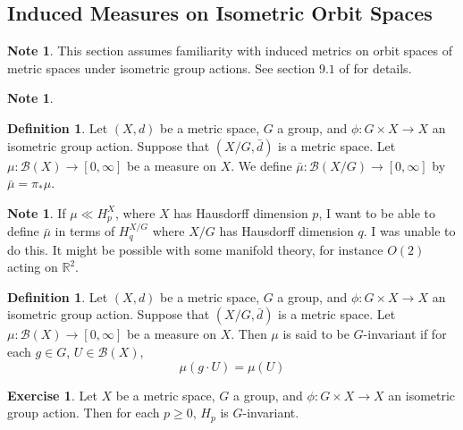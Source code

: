 \documentclass[12pt]{amsart}
\theoremstyle{definition}
\newtheorem{defn}[definition]{Definition}
\newtheorem{note}[definition]{Note}
\newtheorem{ex}[definition]{Exercise}
\newcommand{\R}{\mathbb{R}}
\newcommand{\MB}{\mathcal{B}}
\begin{document}
	
	
	
	
	
	
	
	
	
	
	
	
	
		
	\newpage
	\subsection{Induced Measures on Isometric Orbit Spaces}
	
	\begin{note}
	This section assumes familiarity with induced metrics on orbit spaces of metric spaces under isometric group actions. See section $9.1$ of \cite{analysis} for details. 
	\end{note}
	
	\begin{note}
	
	\end{note}
	
	\begin{defn}
	Let $(X, d)$ be a metric space, $G$ a group, and $\phi: G \times X \rightarrow X$ an isometric group action. Suppose that $(X/G, \bar{d})$ is a metric space. Let $\mu: \MB(X) \rightarrow [0, \infty]$ be a measure on $X$. We define $\bar{\mu}: \MB(X/G) \rightarrow [0, \infty]$ by $\bar{\mu} = \pi_* \mu$. 
	\end{defn}
	
	\begin{note}
	If $\mu \ll H_p^X$, where $X$ has Hausdorff dimension $p$, I want to be able to define $\bar{\mu}$ in terms of $H_q^{X/G}$ where $X/G$ has Hausdorff dimension $q$. I was unable to do this. It might be possible with some manifold theory, for instance $O(2)$ acting on $\R^2$.
	\end{note}
	
	\begin{defn}
	Let $(X, d)$ be a metric space, $G$ a group, and $\phi: G \times X \rightarrow X$ an isometric group action. Suppose that $(X/G, \bar{d})$ is a metric space. Let $\mu: \MB(X) \rightarrow [0, \infty]$ be a measure on $X$. Then $\mu$ is said to be $G$-invariant if for each $g \in G$, $U \in \MB(X)$, 
	\begin{equation*}
	\mu(g \cdot U) = \mu(U)
	\end{equation*}
	\end{defn}
	
	\begin{ex}
	Let $X$ be a metric space, $G$ a group, and $\phi: G \times X \rightarrow X$ an isometric group action. Then for each $p \geq 0$, $H_p$ is $G$-invariant. 
	\end{ex}	
	
\end{document}
